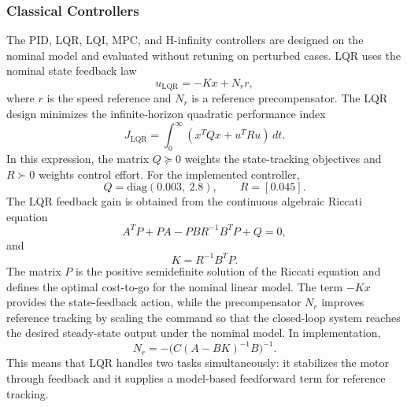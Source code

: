 \documentclass[conference]{IEEEtran}
\begin{document}
\subsubsection{Classical Controllers}
The PID, LQR, LQI, MPC, and H-infinity controllers are designed on the nominal model and evaluated without retuning on perturbed cases. LQR uses the nominal state feedback law
\begin{equation}
u_{\mathrm{LQR}} = -Kx + N_r r,
\end{equation}
where $r$ is the speed reference and $N_r$ is a reference precompensator. The LQR design minimizes the infinite-horizon quadratic performance index
\begin{equation}
J_{\mathrm{LQR}} = \int_0^\infty (x^T Qx + u^T Ru)\,dt.
\end{equation}
In this expression, the matrix $Q \succeq 0$ weights the state-tracking objectives and $R \succ 0$ weights control effort. For the implemented controller,
\begin{equation}
Q = \mathrm{diag}(0.003,\ 2.8),
\qquad
R = [0.045].
\end{equation}
The LQR feedback gain is obtained from the continuous algebraic Riccati equation
\begin{equation}
A^T P + P A - P B R^{-1} B^T P + Q = 0,
\end{equation}
and
\begin{equation}
K = R^{-1} B^T P.
\end{equation}
The matrix $P$ is the positive semidefinite solution of the Riccati equation and defines the optimal cost-to-go for the nominal linear model. The term $-Kx$ provides the state-feedback action, while the precompensator $N_r$ improves reference tracking by scaling the command so that the closed-loop system reaches the desired steady-state output under the nominal model. In implementation,
\begin{equation}
N_r = -\big(C(A-BK)^{-1}B\big)^{-1}.
\end{equation}
This means that LQR handles two tasks simultaneously: it stabilizes the motor through feedback and it supplies a model-based feedforward term for reference tracking.
\end{document}
